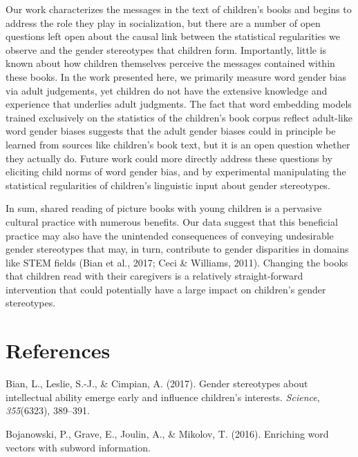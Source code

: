 \documentclass[english,,man,floatsintext]{apa6}
\begin{document}
Our work characterizes the messages in the text of children's books and begins to address the role they play in socialization, but there are a number of open questions left open about the causal link between the statistical regularities we observe and the gender stereotypes that children form. Importantly, little is known about how children themselves perceive the messages contained within these books. In the work presented here, we primarily measure word gender bias via adult judgements, yet children do not have the extensive knowledge and experience that underlies adult judgments. The fact that word embedding models trained exclusively on the statistics of the children's book corpus reflect adult-like word gender biases suggests that the adult gender biases could in principle be learned from sources like children's book text, but it is an open question whether they actually do. Future work could more directly address these questions by eliciting child norms of word gender bias, and by experimental manipulating the statistical regularities of children's linguistic input about gender stereotypes.

In sum, shared reading of picture books with young children is a pervasive cultural practice with numerous benefits. Our data suggest that this beneficial practice may also have the unintended consequences of conveying undesirable gender stereotypes that may, in turn, contribute to gender disparities in domains like STEM fields (Bian et al., 2017; Ceci \& Williams, 2011). Changing the books that children read with their caregivers is a relatively straight-forward intervention that could potentially have a large impact on children's gender stereotypes.

\newpage

\hypertarget{references}{%
\section{References}\label{references}}

\setlength{\parindent}{-0.5in}
\setlength{\leftskip}{0.5in}

\hypertarget{refs}{}
\leavevmode\hypertarget{ref-bian2017gender}{}%
Bian, L., Leslie, S.-J., \& Cimpian, A. (2017). Gender stereotypes about intellectual ability emerge early and influence children's interests. \emph{Science}, \emph{355}(6323), 389--391.

\leavevmode\hypertarget{ref-bojanowski2016enriching}{}%
Bojanowski, P., Grave, E., Joulin, A., \& Mikolov, T. (2016). Enriching word vectors with subword information.
\end{document}
